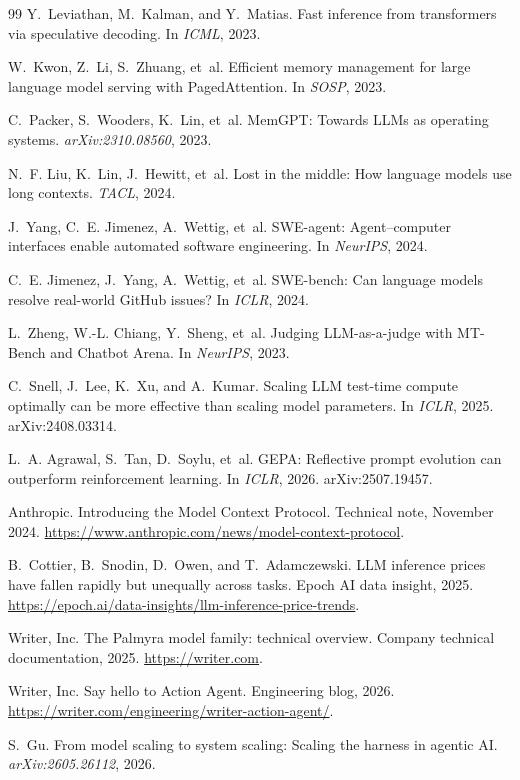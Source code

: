 \documentclass[11pt]{article}
\begin{document}
\begin{thebibliography}{99}
 Y.~Leviathan, M.~Kalman, and Y.~Matias. Fast inference from transformers via speculative decoding. In \emph{ICML}, 2023.

 W.~Kwon, Z.~Li, S.~Zhuang, et~al. Efficient memory management for large language model serving with PagedAttention. In \emph{SOSP}, 2023.

 C.~Packer, S.~Wooders, K.~Lin, et~al. MemGPT: Towards LLMs as operating systems. \emph{arXiv:2310.08560}, 2023.

 N.~F. Liu, K.~Lin, J.~Hewitt, et~al. Lost in the middle: How language models use long contexts. \emph{TACL}, 2024.

 J.~Yang, C.~E. Jimenez, A.~Wettig, et~al. SWE-agent: Agent--computer interfaces enable automated software engineering. In \emph{NeurIPS}, 2024.

 C.~E. Jimenez, J.~Yang, A.~Wettig, et~al. SWE-bench: Can language models resolve real-world GitHub issues? In \emph{ICLR}, 2024.

 L.~Zheng, W.-L. Chiang, Y.~Sheng, et~al. Judging LLM-as-a-judge with MT-Bench and Chatbot Arena. In \emph{NeurIPS}, 2023.

 C.~Snell, J.~Lee, K.~Xu, and A.~Kumar. Scaling LLM test-time compute optimally can be more effective than scaling model parameters. In \emph{ICLR}, 2025. arXiv:2408.03314.

 L.~A. Agrawal, S.~Tan, D.~Soylu, et~al. GEPA: Reflective prompt evolution can outperform reinforcement learning. In \emph{ICLR}, 2026. arXiv:2507.19457.

 Anthropic. Introducing the Model Context Protocol. Technical note, November 2024. \url{https://www.anthropic.com/news/model-context-protocol}.

 B.~Cottier, B.~Snodin, D.~Owen, and T.~Adamczewski. LLM inference prices have fallen rapidly but unequally across tasks. Epoch AI data insight, 2025. \url{https://epoch.ai/data-insights/llm-inference-price-trends}.

 Writer, Inc. The Palmyra model family: technical overview. Company technical documentation, 2025. \url{https://writer.com}.

 Writer, Inc. Say hello to Action Agent. Engineering blog, 2026. \url{https://writer.com/engineering/writer-action-agent/}.

 S.~Gu. From model scaling to system scaling: Scaling the harness in agentic AI. \emph{arXiv:2605.26112}, 2026.


\end{thebibliography}
\end{document}
